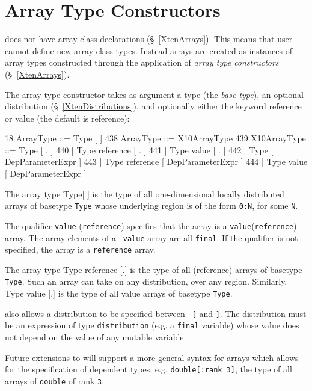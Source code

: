 \section{Array Type Constructors}
\label{ArrayypeConstructors}

{}\XtenCurrVer{} does not have array class declarations
(\S~\ref{XtenArrays}). This means that user cannot define new array
class types. Instead arrays are created as instances of array types
constructed through the application of {\em array type constructors}
(\S~\ref{XtenArrays}).

The array type constructor takes as argument a type (the {\em base
type}), an optional distribution (\S~\ref{XtenDistributions}), and
optionally either the keyword {\cf reference} or {\cf value} (the
default is reference):
\begin{x10}
18    ArrayType ::= Type [ ]
438   ArrayType ::= X10ArrayType
439   X10ArrayType ::= Type [ . ]
440     | Type reference [ . ]
441     | Type value [ . ]
442     | Type [ DepParameterExpr ]
443     | Type reference [ DepParameterExpr ]
444     | Type value [ DepParameterExpr ]
\end{x10}

The array type {\cf Type[ ] } is the type of all
one-dimensional locally distributed arrays of basetype {\tt Type}
whose underlying region is of the form {\tt 0:N}, for some {\tt N}.

The qualifier {\tt value} ({\tt reference}) specifies that the array
is a {\tt value}({\tt reference}) array. The array elements of a {\tt
value} array are all {\tt final}. If the qualifier is not specified,
the array is a {\tt reference} array.

The array type {\cf Type reference [.]} is the type of all (reference)
arrays of basetype {\tt Type}. Such an array can take on any
distribution, over any region. Similarly, {\cf Type value [.]} is the
type of all value arrays of basetype {\tt Type}.

\XtenCurrVer{} also allows a distribution to be specified between {\tt
[} and {\tt ]}. The distribution must be an expression of type
{\tt distribution} (e.g.{} a {\tt final} variable) whose
value does not depend on the value of any mutable variable.

Future extensions to \Xten{} will support a more general syntax for
arrays which allows for the specification of dependent types, 
e.g.{} {\tt double[:rank 3]}, the type of all arrays of 
{\tt double} of rank {\tt 3}.


